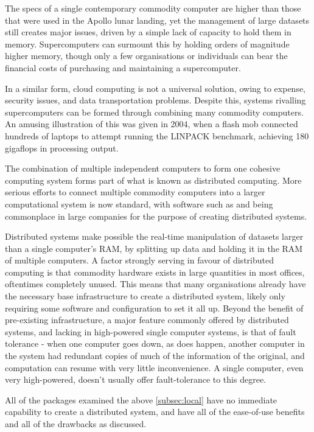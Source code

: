 
The specs of a single contemporary commodity computer are higher than those that were used in the Apollo lunar landing, yet the management of large datasets still creates major issues, driven by a simple lack of capacity to hold them in memory.
Supercomputers can surmount this by holding orders of magnitude higher memory, though only a few organisations or individuals can bear the financial costs of purchasing and maintaining a supercomputer.

In a similar form, cloud computing is not a universal solution, owing to expense, security issues, and data transportation problems.
Despite this, systems rivalling supercomputers can be formed through combining many commodity computers.
An amusing illustration of this was given in 2004, when a flash mob connected hundreds of laptops to attempt running the LINPACK benchmark, achieving 180 gigaflops in processing output\cite{perry2004flashcomp}.

The combination of multiple independent computers to form one cohesive computing system forms part of what is known as distributed computing.
More serious efforts to connect multiple commodity computers into a larger computational system is now standard, with software such as  and  being commonplace in large companies for the purpose of creating distributed systems.

Distributed systems make possible the real-time manipulation of datasets larger than a single computer's RAM, by splitting up data and holding it in the RAM of multiple computers.
A factor strongly serving in favour of distributed computing is that commodity hardware exists in large quantities in most offices, oftentimes completely unused.
This means that many organisations already have the necessary base infrastructure to create a distributed system, likely only requiring some software and configuration to set it all up.
Beyond the benefit of pre-existing infrastructure, a major feature commonly offered by distributed systems, and lacking in high-powered single computer systems, is that of fault tolerance - when one computer goes down, as does happen, another computer in the system had redundant copies of much of the information of the original, and computation can resume with very little inconvenience.
A single computer, even very high-powered, doesn't usually offer fault-tolerance to this degree.

All of the packages examined the above \cref{subsec:local} have no immediate capability to create a distributed system, and have all of the ease-of-use benefits and all of the drawbacks as discussed.

